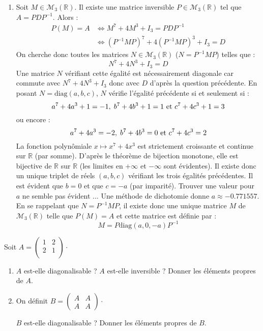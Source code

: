 \documentclass[a4paper,10pt]{report}
\begin{document}
\begin{enumerate}
\item Soit $M \in \mathcal{M}_3(\mathbb{R})$. Il existe une matrice inversible $P \in \mathcal{M}_3(\mathbb{R})$ tel que $A=PDP^{-1}$. Alors :
\begin{align*}
P(M) =A & \Longleftrightarrow M^7+4M^3 + I_3 = PDP^{-1} \\
& \Longleftrightarrow (P^{-1}MP)^7 + 4(P^{-1}MP)^3+ I_3 = D 
\end{align*}
On cherche donc toutes les matrices $N \in \mathcal{M}_3(\mathbb{R})$ ($N=P^{-1}MP$) telles que :
$$ N^7+4N^3+I_3=D$$
Une matrice $N$ vérifiant cette égalité est nécessairement diagonale car commute avec $N^7+4N^3+I_3$ donc avec $D$ d'après la question précédente. En posant $N= \textrm{diag}(a,b,c)$, $N$ vérifie l'égalité précédente si et seulement si :
$$ a^7+ 4a^3+1= -1, \; b^7+ 4b^3+1= 1 \hbox{ et } c^7+ 4c^3+1= 3 $$
ou encore :
$$ a^7+ 4a^3= -2, \; b^7+ 4b^3= 0 \hbox{ et } c^7+ 4c^3= 2 $$
La fonction polynômiale $x \mapsto x^7+4x^3$ est strictement croissante et continue sur $\mathbb{R}$ (par somme). D'après le théorème de bijection monotone, elle est bijective de $\mathbb{R}$ sur $\mathbb{R}$ (les limites en $+ \infty$ et $- \infty$ sont évidentes). Il existe donc un unique triplet de réels $(a,b,c)$ vérifiant les trois égalités précédentes. Il est évident que $b=0$ et que $c=-a$ (par imparité). Trouver une valeur pour $a$ ne semble pas évident ... Une méthode de dichotomie donne $a \approx -0.771557$. En se rappelant que $N=P^{-1}MP$, il existe donc une unique matrice $M$ de $\mathcal{M}_3(\mathbb{R})$ telle que $P(M)=A$ et cette matrice est définie par :
$$ M = P \textrm{diag}(a,0,-a) P^{-1}$$
\end{enumerate}


\begin{Exa} Soit $A= \begin{pmatrix}
1& 2 \\
2 & 1 \\
\end{pmatrix}\cdot$
\begin{enumerate}
\item $A$ est-elle diagonalisable ? $A$ est-elle inversible ? Donner les éléments propres de $A$.
\item  On définit $B = \begin{pmatrix}
A & A \\
A & A 
\end{pmatrix}\cdot$

$B$ est-elle diagonalisable ? Donner les éléments propres de $B$.
\end{enumerate}
\end{Exa}
\end{document}

